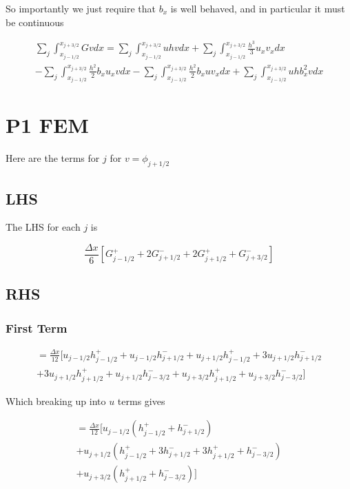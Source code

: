 \documentclass[12pt]{article}
\begin{document}
So importantly we just require that $b_x$ is well behaved, and in particular it must be continuous


\begin{multline*}
\sum_{j}\int_{x_{j-1/2}}^{x_{j+3/2}} Gv dx = \sum_{j}\int_{x_{j-1/2}}^{x_{j+3/2}}  uhv dx + \sum_{j}\int_{x_{j-1/2}}^{x_{j+3/2}} \frac{h^3}{3}u_{x}v_{x}dx \\- \sum_{j}\int_{x_{j-1/2}}^{x_{j+3/2}} \frac{h^2}{2}b_x u_x vdx -\sum_{j}\int_{x_{j-1/2}}^{x_{j+3/2}}  \frac{h^2}{2}b_x u v_x dx + \sum_{j}\int_{x_{j-1/2}}^{x_{j+3/2}} u h b_x^2 vdx 
\end{multline*}

\section{P1 FEM}
Here are the terms for $j$ for $v = \phi_{j + 1/2}$

\subsection{LHS}
 The LHS for each $j$ is
 
 \[\frac{\Delta x}{6}  \left[G^+_{j- 1/2} +  2G^-_{j+ 1/2} +  2G^+_{j+ 1/2}  +  G^-_{j+ 3/2}\right]\]


\subsection{RHS} 
\subsubsection{First Term}
 
 \begin{multline}
 = \frac{\Delta x}{12} \bigg[ u_{j- 1/2}h^+_{j- 1/2} + u_{j- 1/2}h^-_{j+ 1/2}
 +  u_{j+1/2}h^+_{j- 1/2} + 3u_{j+1/2}h^-_{j+ 1/2} \\ + 3u_{j+1/2} h^+_{j+ 1/2}  + u_{j+1/2} h^-_{j- 3/2}
 +u_{j+ 3/2}h^+_{j+ 1/2} + u_{j+ 3/2}h^-_{j- 3/2} \bigg]
 \end{multline}
 
 Which breaking up into $u$ terms gives
 
  \begin{multline}
  = \frac{\Delta x}{12} \bigg[ u_{j- 1/2} \left(h^+_{j- 1/2} + h^-_{j+ 1/2} \right) \\
  +  u_{j+1/2} \left(h^+_{j- 1/2} + 3h^-_{j+ 1/2} + 3 h^+_{j+ 1/2}  + h^-_{j- 3/2} \right) \\
  +u_{j+ 3/2}\left(h^+_{j+ 1/2} + h^-_{j- 3/2}\right) \bigg]
  \end{multline} 
  
\end{document}
